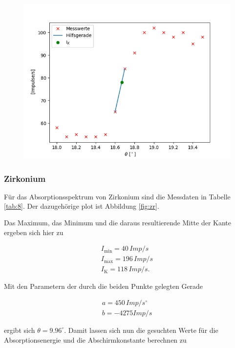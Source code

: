\begin{figure}
    \centering
    \includegraphics{zn.png}
    \label{fig:zn}
\end{figure}

\subsubsection{Zirkonium}

Für das Absorptionsspektrum von Zirkonium sind die Messdaten in Tabelle \ref{tab:8}. Der dazugehörige plot ist Abbildung \ref{fig:zr}.

Das Maximum, das Minimum und die daraus resultierende Mitte der Kante ergeben sich hier zu 

\begin{align*}
    I_\text{min} = 40 \, Imp/s \\
    I_\text{max} = 196 \, Imp/s \\
    I_\text{K} = 118 \, Imp/s.
\end{align*}

Mit den Parametern der durch die beiden Punkte gelegten Gerade

\begin{align*}
    a = 450 \, Imp/s^\circ \\
    b = -4275 Imp/s
\end{align*}

ergibt sich $\theta = 9.96  ^\circ$. Damit lassen sich nun die gesuchten Werte für die Absorptionsenergie und die Abschirmkonstante berechnen zu 

